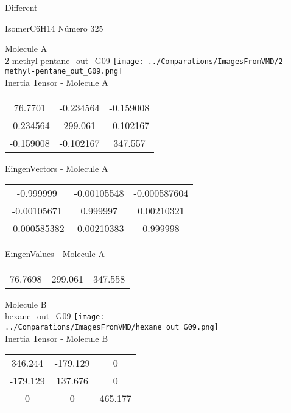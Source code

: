 \begin{center}
\vtab
\vtab
\textcolor{NavyBlue}{\Large Different}
\end{center}

 \newpage

\vtab[-2cm]
\begin{center}
{\large IsomerC6H14 \tab Número 325}
\end{center}
\begin{multicols}{2}
\begin{center}

Molecule A \\ 
2-methyl-pentane\_out\_G09
\texttt{[image: ../Comparations/ImagesFromVMD/2-methyl-pentane\_out\_G09.png]}
\\
Inertia Tensor - Molecule A \\
\vtab

\begin{tabular}{|c c c|}
76.7701	 & 	-0.234564	 & 	-0.159008	 \\
-0.234564	 & 	299.061	 & 	-0.102167	 \\
-0.159008	 & 	-0.102167	 & 	347.557
\end{tabular}

\vtab
 EingenVectors - Molecule A     \\
\vtab
\begin{tabular}{|c c c|}
-0.999999	 & 	-0.00105548	 & 	-0.000587604	 \\
-0.00105671	 & 	0.999997	 & 	0.00210321	 \\
-0.000585382	 & 	-0.00210383	 & 	0.999998
\end{tabular}

\vtab
 EingenValues - Molecule A     \\
\vtab
\begin{tabular}{|c c c|}
76.7698	 & 	299.061	 & 	347.558	 \\
\end{tabular}
\columnbreak

Molecule B \\ 
hexane\_out\_G09
\texttt{[image: ../Comparations/ImagesFromVMD/hexane\_out\_G09.png]}
\\
Inertia Tensor - Molecule B \\
\vtab

\begin{tabular}{|c c c|}
346.244	 & 	-179.129	 & 	0	 \\
-179.129	 & 	137.676	 & 	0	 \\
0	 & 	0	 & 	465.177
\end{tabular}


\end{center}
\end{multicols}
